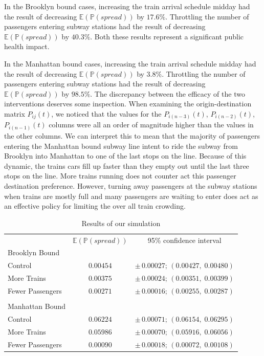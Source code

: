 \documentclass[12pt]{article}
\begin{document}
	In the Brooklyn bound cases, increasing the train arrival schedule midday had the result of decreasing $\mathbb{E}(\mathbb{P}(spread))$ by $17.6\%$. Throttling the number of passengers entering subway stations had the result of decreasing $\mathbb{E}(\mathbb{P}(spread))$ by $40.3\%$. Both these results represent a significant public health impact. 
	
	In the Manhattan bound cases, increasing the train arrival schedule midday had the result of decreasing $\mathbb{E}(\mathbb{P}(spread))$ by $3.8\%$. Throttling the number of passengers entering subway stations had the result of decreasing $\mathbb{E}(\mathbb{P}(spread))$ by $98.5\%$. The discrepancy between the efficacy of the two interventions deserves some inspection. When examining the origin-destination matrix $P_{ij}(t)$, we noticed that the values for the $P_{i(n-3)}(t)$, $P_{i(n-2)}(t)$, $P_{i(n-1)}(t)$ columns were all an order of magnitude higher than the values in the other columns. We can interpret this to mean that the majority of passengers entering the Manhattan bound subway line intent to ride the subway from Brooklyn into Manhattan to one of the last stops on the line. Because of this dynamic, the trains cars fill up faster than they empty out until the last three stops on the line. More trains running does not counter act this passenger destination preference. However, turning away passengers at the subway stations when trains are mostly full and many passengers are waiting to enter does act as an effective policy for limiting the over all train crowding.

	\begin{table}
	\centering
	\begin{tabular}{ l| c c }
		                 & $\mathbb{E}(\mathbb{P}(spread))$  & 95\% confidence interval\\
		Brooklyn Bound   & & \\
		                  \hline
		Control          & $0.00454$ & $\pm\, 0.00027;\, ( 0.00427,\;  0.00480)$ \\ 
		More Trains      & $0.00375$ & $\pm\, 0.00024;\, ( 0.00351,\;  0.00399)$ \\  
		Fewer Passengers & $0.00271$ & $\pm\, 0.00016;\, ( 0.00255,\;  0.00287)$ \\
		\\
		Manhattan Bound & & \\
		\hline
		Control          & $0.06224$ & $\pm\, 0.00071;\, ( 0.06154,\;  0.06295)$ \\ 
		More Trains      & $0.05986$ & $\pm\, 0.00070;\, ( 0.05916,\;  0.06056)$ \\  
		Fewer Passengers & $0.00090$ & $\pm\, 0.00018;\, ( 0.00072,\;  0.00108)$ \\
	\end{tabular}
	\caption{Results of our simulation}
	\label{main-results}
	\end{table}
\end{document}
